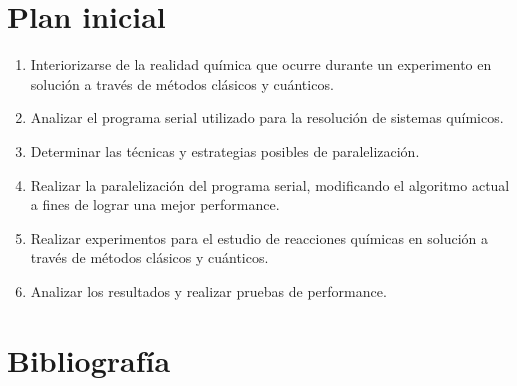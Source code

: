 \documentclass[a4paper, 12pt]{article}
\begin{document}
\section*{Plan inicial}

\begin{enumerate}
\item Interiorizarse de la realidad qu\'imica que ocurre durante un experimento en soluci\'on a trav\'es de m\'etodos cl\'asicos y cu\'anticos.

\item Analizar el programa serial utilizado para la resoluci\'on de sistemas qu\'imicos.

\item Determinar las t\'ecnicas y estrategias posibles de paralelizaci\'on.

\item Realizar la paralelizaci\'on del programa serial, modificando el algoritmo actual a fines de lograr una mejor performance.

\item Realizar experimentos para el estudio de reacciones qu\'imicas en soluci\'on a trav\'es de m\'etodos cl\'asicos y cu\'anticos.

\item Analizar los resultados y realizar pruebas de performance.

\end{enumerate}

\section*{Bibliograf\'ia}
\end{document}
